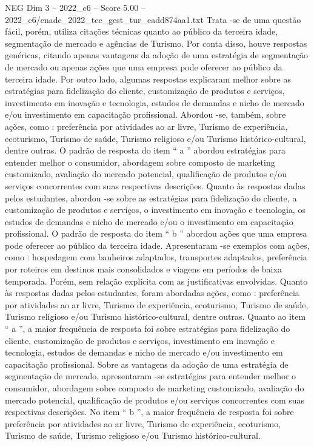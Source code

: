 \begin{textsample}{NEG Dim 3 – 2022\_c6 – Score 5.00 – 2022\_c6/enade\_2022\_tec\_gest\_tur\_eadd874aa1.txt}
Trata -se de uma questão fácil, porém, utiliza citações técnicas quanto ao público da terceira idade, segmentação de mercado e agências de Turismo.
Por conta disso, houve respostas genéricas, citando apenas vantagens da adoção de uma estratégia de segmentação de mercado ou apenas ações que uma empresa pode oferecer ao público da terceira idade.
Por outro lado, algumas respostas explicaram melhor sobre as estratégias para fidelização do cliente, customização de produtos e serviços, investimento em inovação e tecnologia, estudos de demandas e nicho de mercado e/ou investimento em capacitação profissional.
Abordou -se, também, sobre ações, como : preferência por atividades ao ar livre, Turismo de experiência, ecoturismo, Turismo de saúde, Turismo religioso e/ou Turismo histórico-cultural, dentre outras.
O padrão de resposta do item “ a ” abordou estratégias para entender melhor o consumidor, abordagem sobre composto de marketing customizado, avaliação do mercado potencial, qualificação de produtos e/ou serviços concorrentes com suas respectivas descrições.
Quanto às respostas dadas pelos estudantes, abordou -se sobre as estratégias para fidelização do cliente, a customização de produtos e serviços, o investimento em inovação e tecnologia, os estudos de demandas e nicho de mercado e/ou o investimento em capacitação profissional.
O padrão de resposta do item “ b ” abordou ações que uma empresa pode oferecer ao público da terceira idade.
Apresentaram -se exemplos com ações, como : hospedagem com banheiros adaptados, transportes adaptados, preferência por roteiros em destinos mais consolidados e viagens em períodos de baixa temporada.
Porém, sem relação explícita com as justificativas envolvidas.
Quanto às respostas dadas pelos estudantes, foram abordadas ações, como : preferência por atividades ao ar livre, Turismo de experiência, ecoturismo, Turismo de saúde, Turismo religioso e/ou Turismo histórico-cultural, dentre outras.
Quanto ao item “ a ”, a maior frequência de resposta foi sobre estratégias para fidelização do cliente, customização de produtos e serviços, investimento em inovação e tecnologia, estudos de demandas e nicho de mercado e/ou investimento em capacitação profissional.
Sobre as vantagens da adoção de uma estratégia de segmentação de mercado, apresentaram -se estratégias para entender melhor o consumidor, abordagem sobre composto de marketing customizado, avaliação do mercado potencial, qualificação de produtos e/ou serviços concorrentes com suas respectivas descrições.
No item “ b ”, a maior frequência de resposta foi sobre preferência por atividades ao ar livre, Turismo de experiência, ecoturismo, Turismo de saúde, Turismo religioso e/ou Turismo histórico-cultural.

\end{textsample}
